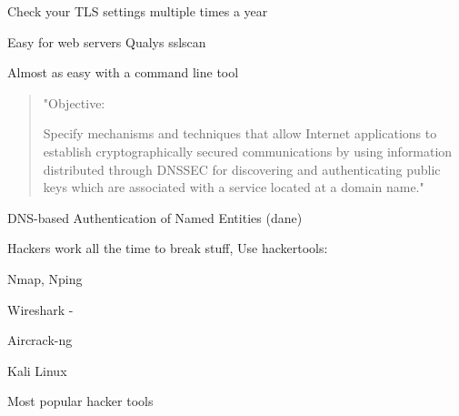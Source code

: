 \documentclass[Screen16to9,17pt]{foils}
\begin{document}


\begin{list2}
\item Check your TLS settings multiple times a year
\item Easy for web servers Qualys sslscan
\item Almost as easy with a command line tool
\end{list2}



\begin{quote}
"Objective:

Specify mechanisms and techniques that allow Internet applications to
establish cryptographically secured communications by using information
distributed through DNSSEC for discovering and authenticating public
keys which are associated with a service located at a domain name."
\end{quote}

\begin{list1}
\item DNS-based Authentication of Named Entities (dane)
\end{list1}






\begin{list2}
\item Hackers work all the time to break stuff, Use hackertools:
\item Nmap, Nping 
\item Wireshark - 
\item Aircrack-ng 
\item Kali Linux 
\end{list2}

\vskip 5mm
\centerline{Most popular hacker tools }




\end{document}
